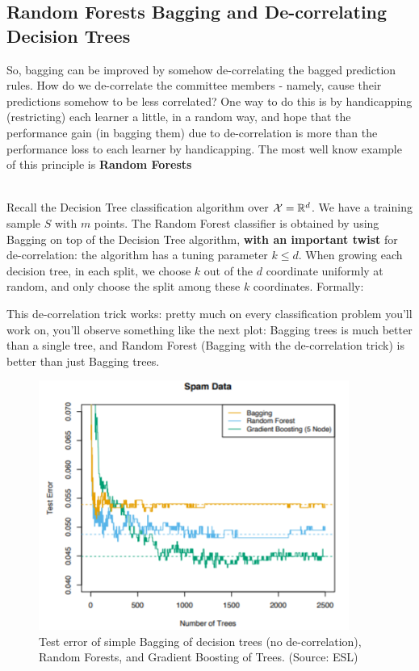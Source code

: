 \subsection{Random Forests Bagging and De-correlating Decision Trees}
So, bagging can be improved by somehow de-correlating the bagged prediction rules. How do we de-correlate the committee members - namely, cause their predictions somehow to be less correlated? One way to do this is by handicapping (restricting) each learner a little, in a random way, and hope that the performance gain (in bagging them) due to de-correlation is more than the performance loss to each learner by handicapping. The most well know example of this principle is \textbf{Random Forests}

~\\
Recall the Decision Tree classification algorithm over $\mathcal{X}=\mathbb{R}^d$. We have a training sample $S$ with $m$ points. The Random Forest classifier is obtained by using Bagging on top of the Decision Tree algorithm, \textbf{with an important twist} for de-correlation: the algorithm has a tuning parameter $k\leq d$. When growing each decision tree, in each split, we choose $k$ out of the $d$ coordinate uniformly at random, and only choose the split among these $k$ coordinates. Formally:


This de-correlation trick works: pretty much on every classification problem you'll work on, you'll observe something like the next plot: Bagging trees is
much better than a single tree, and Random Forest (Bagging with the de-correlation trick) is better than just Bagging trees.

\begin{figure}[h!]
	\centering
	\includegraphics[width=4in]{chapters/ensemble.methods/figures/bagging_vs_rf.png}
	\caption{Test error of simple Bagging of decision trees (no de-correlation), Random Forests, and Gradient Boosting of Trees. (Source: ESL)}
\end{figure}

